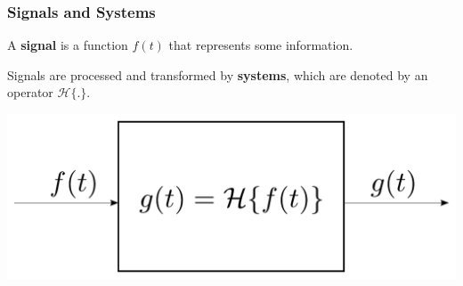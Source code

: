 

\begin{frame}
    \frametitle{Signals and Systems}
    \begin{myDefinition}
        A \textbf{signal} is a function $f(t)$ that represents some information.

        \vspace{5mm}

        Signals are processed and transformed by \textbf{systems}, which are denoted by an operator $\mathcal{H}\{.\}$.
    \end{myDefinition}
    \begin{center}
        \includegraphics[height=.35\textheight ]{images/SystemBlock.pdf}
    \end{center}

\end{frame}




